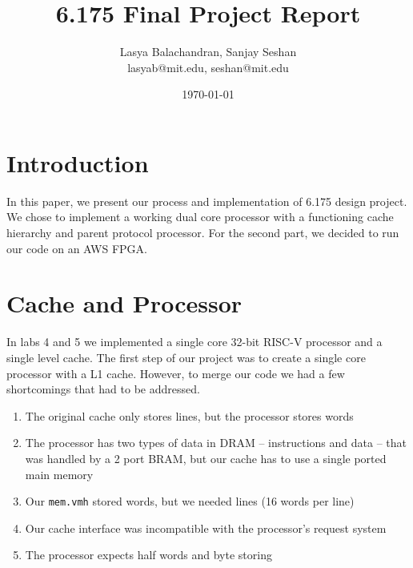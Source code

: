 \documentclass{article}
\title{6.175 Final Project Report}
\author{Lasya Balachandran, Sanjay Seshan\\lasyab@mit.edu, seshan@mit.edu}
\date{\today}
\begin{document}


\maketitle

\section{Introduction}

In this paper, we present our process and implementation of 6.175 design project. We chose to implement a working dual core processor with a functioning cache hierarchy and parent protocol processor. For the second part, we decided to run our code on an AWS FPGA.

\section{Cache and Processor}

In labs 4 and 5 we implemented a single core 32-bit RISC-V processor and a single level cache. The first step of our project was to create a single core processor with a L1 cache. However, to merge our code we had a few shortcomings that had to be addressed. 

\begin{enumerate}[(1)]
    \item The original cache only stores lines, but the processor stores words
    \item The processor has two types of data in DRAM -- instructions and data -- that was handled by a 2 port BRAM, but our cache has to use a single ported main memory
    \item Our \lstinline{mem.vmh} stored words, but we needed lines (16 words per line)
    \item Our cache interface was incompatible with the processor's request system
    \item The processor expects half words and byte storing
\end{enumerate}
\end{document}
